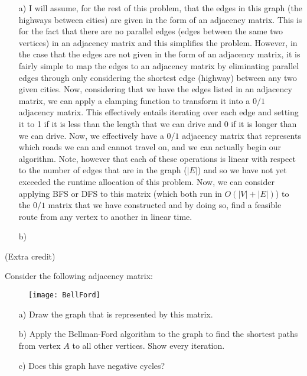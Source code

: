\documentclass{article}
\begin{document}
\begin{solution}
\begin{itemize}
	\item[a)]{} I will assume, for the rest of this problem, that the edges in this graph (the highways between cities) are given in the form of an adjacency matrix.  This is for the fact that there are no parallel edges (edges between the same two vertices) in an adjacency matrix and this simplifies the problem.  However, in the case that the edges are not given in the form of an adjacency matrix, it is fairly simple to map the edges to an adjacency matrix by eliminating parallel edges through only considering the shortest edge (highway) between any two given cities.  Now, considering that we have the edges listed in an adjacency matrix, we can apply a clamping function to transform it into a $0/1$ adjacency matrix.  This effectively entails iterating over each edge and setting it to 1 if it is less than the length that we can drive and 0 if it is longer than we can drive.  Now, we effectively have a $0/1$ adjacency matrix that represents which roads we can and cannot travel on, and we can actually begin our algorithm. Note, however that each of these operations is linear with respect to the number of edges that are in the graph ($|E|$) and so we have not yet exceeded the runtime allocation of this problem.  Now, we can consider applying BFS or DFS to this matrix (which both run in $O(|V|+|E|)$) to the $0/1$ matrix that we have constructed and by doing so, find a feasible route from any vertex to another in linear time.
	\item[b)]{} 
\end{itemize}
\end{solution}

\newpage




\begin{problem} (Extra credit)

Consider the following adjacency matrix:
\begin{figure}[h!]
    \centering
    \texttt{[image: BellFord]}
\end{figure}
\begin{itemize}
	\item[a)]{} Draw the graph that is represented by this matrix.
	\item[b)]{} Apply the Bellman-Ford algorithm to the graph to find the shortest paths from vertex $A$ to all other vertices.  Show every iteration.
	\item[c)]{} Does this graph have negative cycles?
\end{itemize}
\end{problem}

\begin{solution}
\end{solution}

\end{document}
